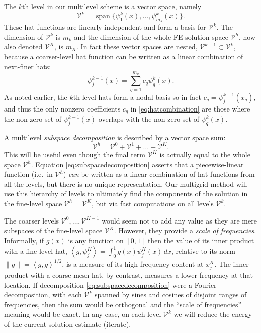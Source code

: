 \documentclass[letterpaper,final,12pt,reqno]{amsart}
\newcommand{\ip}[2]{\left<#1,#2\right>}
\numberwithin{equation}{section}
\numberwithin{figure}{section}
\numberwithin{table}{section}
\begin{document}
The $k$th level in our multilevel scheme is a vector space, namely
\begin{equation}
  \mathcal{V}^k = \operatorname{span}\{\psi_1^k(x),\dots,\psi_{m_k}^k(x)\}.  \label{eq:definevk}
\end{equation}
These hat functions are linearly-independent and form a basis for $\mathcal{V}^k$.  The dimension of $\mathcal{V}^k$ is $m_k$ and the dimension of the whole FE solution space $\mathcal{V}^h$, now also denoted $\mathcal{V}^K$, is $m_K$.  In fact these vector spaces are nested, $\mathcal{V}^{k-1} \subset \mathcal{V}^k$, because a coarser-level hat function can be written as a linear combination of next-finer hats:
\begin{equation}
   \psi_j^{k-1}(x) = \sum_{q=1}^{m_k} c_q \psi_q^k(x). \label{eq:hatcombination}
\end{equation}
As noted earlier, the $k$th level hats form a nodal basis so in fact $c_q = \psi_j^{k-1}(x_q)$, and thus the only nonzero coefficients $c_q$ in \eqref{eq:hatcombination} are those where the non-zero set of $\psi_j^{k-1}(x)$ overlaps with the non-zero set of $\psi_q^k(x)$.

A multilevel \emph{subspace decomposition} is described by a vector space sum:
\begin{equation}
  \mathcal{V}^h = \mathcal{V}^0 + \mathcal{V}^1 + \dots + \mathcal{V}^K. \label{eq:subspacedecomposition}
\end{equation}
This will be useful even though the final term $\mathcal{V}^K$ is actually equal to the whole space $\mathcal{V}^h$.  Equation \eqref{eq:subspacedecomposition} asserts that a piecewise-linear function (i.e.~in $\mathcal{V}^h$) \emph{can} be written as a linear combination of hat functions from all the levels, but there is no unique representation.  Our multigrid method will use this hierarchy of levels to ultimately find the components of the solution in the fine-level space $\mathcal{V}^h=\mathcal{V}^K$, but via fast computations on all levels $\mathcal{V}^k$.

The coarser levels $\mathcal{V}^0,\dots,\mathcal{V}^{K-1}$ would seem not to add any value as they are mere subspaces of the fine-level space $\mathcal{V}^K$.  However, they provide a \emph{scale of frequencies}.  Informally, if $g(x)$ is any function on $[0,1]$ then the value of its inner product with a fine-level hat, $\ip{g}{\psi_j^K} = \int_0^1 g(x) \psi_j^K(x)\,dx$, relative to its norm $\|g\| = \ip{g}{g}^{1/2}$, is a measure of its high-frequency content at $x_j^K$.  The inner product with a coarse-mesh hat, by contrast, measures a lower frequency at that location.  If decomposition \eqref{eq:subspacedecomposition} were a Fourier decomposition, with each $\mathcal{V}^k$ spanned by sines and cosines of disjoint ranges of frequencies, then the sum would be orthogonal and the ``scale of frequencies'' meaning would be exact.  In any case, on each level $\mathcal{V}^k$ we will reduce the energy of the current solution estimate (iterate).
\end{document}

